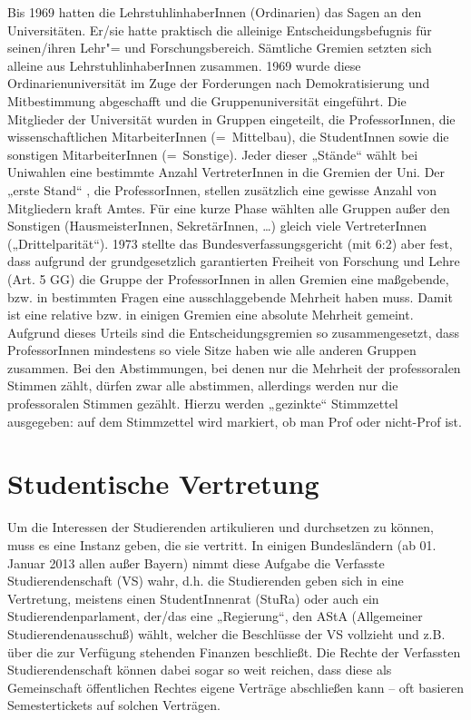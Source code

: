 Bis 1969 hatten die LehrstuhlinhaberInnen (Ordinarien) das Sagen an den
Universitäten. Er/sie hatte praktisch die alleinige Entscheidungsbefugnis
für seinen/ihren Lehr"= und Forschungsbereich. Sämtliche Gremien setzten
sich alleine aus LehrstuhlinhaberInnen zusammen. 1969 wurde diese
Ordinarienuniversität im Zuge der Forderungen nach Demokratisierung und
Mitbestimmung abgeschafft und die Gruppenuniversität eingeführt. Die
Mitglieder der Universität wurden in Gruppen eingeteilt, die
ProfessorInnen, die wissenschaftlichen MitarbeiterInnen (=\ Mittelbau), die
StudentInnen sowie die sonstigen MitarbeiterInnen (=\ Sonstige). Jeder
dieser „Stände“ wählt bei Uniwahlen eine bestimmte Anzahl VertreterInnen
in die Gremien der Uni. Der „erste Stand“ , die ProfessorInnen, stellen
zusätzlich eine gewisse Anzahl von Mitgliedern kraft Amtes. Für eine kurze
Phase wählten alle Gruppen außer den Sonstigen (HausmeisterInnen,
SekretärInnen, \dots) gleich viele VertreterInnen („Drittelparität“).
1973 stellte das Bundesverfassungsgericht (mit 6:2) aber fest, dass
aufgrund der grundgesetzlich garantierten Freiheit von Forschung und Lehre
(Art. 5 GG) die Gruppe der ProfessorInnen in allen Gremien eine
maßgebende, bzw. in bestimmten Fragen eine ausschlaggebende Mehrheit haben
muss. Damit ist eine relative bzw. in einigen Gremien eine absolute
Mehrheit gemeint. Aufgrund dieses Urteils sind die Entscheidungsgremien so
zusammengesetzt, dass ProfessorInnen mindestens so viele Sitze haben wie
alle anderen Gruppen zusammen. Bei den Abstimmungen, bei denen nur die
Mehrheit der professoralen Stimmen zählt, dürfen zwar alle abstimmen,
allerdings werden nur die professoralen Stimmen gezählt. Hierzu werden
„gezinkte“ Stimmzettel ausgegeben: auf dem Stimmzettel wird markiert, ob
man Prof oder nicht-Prof ist.



\section{Studentische Vertretung}
Um die Interessen der Studierenden artikulieren und durchsetzen zu können,
muss es eine Instanz geben, die sie vertritt. In einigen Bundesländern
(ab 01. Januar 2013 allen außer Bayern) nimmt diese Aufgabe die
Verfasste Studierendenschaft (VS) wahr, d.h. die Studierenden geben sich
in eine Vertretung, meistens einen StudentInnenrat (StuRa)
oder auch ein Studierendenparlament, der/das eine „Regierung“, den AStA
(Allgemeiner Studierendenausschuß) wählt, welcher die Beschlüsse der VS
vollzieht und z.B. über die zur Verfügung stehenden Finanzen beschließt.
Die Rechte der Verfassten Studierendenschaft können dabei sogar so weit
reichen, dass diese als Gemeinschaft öffentlichen Rechtes eigene Verträge
abschließen kann -- oft basieren Semestertickets auf solchen Verträgen.

